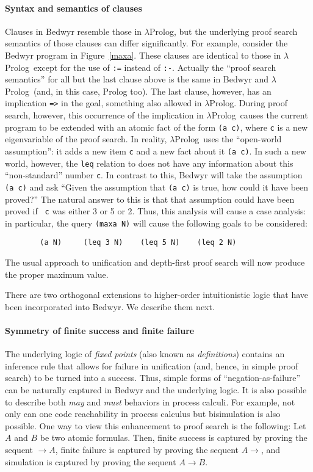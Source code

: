 \documentclass{article}
\newcommand{\lp}{$\lambda$Prolog}
\begin{document}
\paragraph{Syntax and semantics of clauses}
Clauses in Bedwyr resemble those in \lp, but the underlying proof
search semantics of those clauses can differ significantly.  For example,
consider the Bedwyr program in Figure~\ref{maxa}.  These clauses are
identical to those in \lp\ except for the use of \verb+:=+ instead of
\verb+:-+.  Actually the ``proof search semantics'' for all but the
last clause above is the same in Bedwyr and \lp\ (and, in this case,
Prolog too).  The last clause, however, has an implication \verb+=>+
in the goal, something also allowed in \lp.  During proof search,
however, this occurrence of the implication in \lp\ causes the current
program to be extended with an atomic fact of the form \verb+(a c)+,
where {\tt c} is a new eigenvariable of the proof search.  In reality,
\lp\ uses the ``open-world assumption'': it adds a new item {\tt c}
and a new fact about it {\tt (a c)}.  In such a new world, however, the 
{\tt leq} relation to does not have any information about this
``non-standard'' number {\tt c}.  In contrast to this, Bedwyr will
take the assumption  {\tt (a c)} and ask ``Given the assumption that 
{\tt (a c)} is true, how could it have been proved?''  The natural
answer to this is that that assumption could have been proved if {\tt
c} was either 3 or 5 or 2.  Thus, this analysis will cause a case
analysis: in particular, the query {\tt (maxa N)} will cause the
following goals to be considered:
\begin{verbatim}
        (a N)     (leq 3 N)    (leq 5 N)    (leq 2 N)
\end{verbatim}
The usual approach to unification and depth-first proof search will
now produce the proper maximum value.

\bigskip
There are two orthogonal extensions to higher-order intuitionistic
logic that have been incorporated into Bedwyr.   We describe them next.

\paragraph{Symmetry of finite success and finite failure}
The underlying logic of {\em fixed points} (also known as {\em
definitions})
\cite{girard92mail,schroeder-Heister93lics,mcdowell03tcs,momigliano03types}
contains an inference rule that allows for failure in unification
(and, hence, in simple proof search) to be turned into a success.
Thus, simple forms of ``negation-as-failure'' can be naturally
captured in Bedwyr and the underlying logic.  It is also possible to
describe both {\em may} and {\em must} behaviors in process calculi.
For example, not only can one code reachability in process calculus
but bisimulation is also possible.  One way to view this enhancement
to proof search is the following: Let $A$ and $B$ be two atomic
formulas.  Then, finite success is captured by proving the sequent
$\longrightarrow A$, finite failure is captured by proving the sequent
$A\longrightarrow$, and simulation is captured by proving the sequent
$A\longrightarrow B$.
\end{document}
